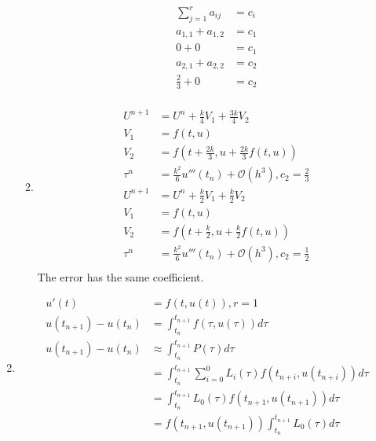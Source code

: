 \documentclass{article}
\begin{document}
\begin{enumerate}
\begin{enumerate}
\begin{equation*}
\begin{split}
		\end{split}
		\end{equation*}
		\begin{equation*}
		\begin{split}
		\sum_{j=1}^{r} a_{ij} & = c_{i} \\
		 a_{1,1}+a_{1,2} & = c_{1} \\
		0+0 & = c_{1} \\
		a_{2,1} + a_{2,2} & = c_{2} \\
		\frac{2}{3} + 0 & = c_{2} \\
		\end{split}
		\end{equation*}
	\item
		\begin{equation*}
		\begin{split}
			U^{n+1} & = U^{n} +  \frac{k}{4} V_{1} +\frac{3k}{4} V_{2} \\
			V_{1} &= f(t,u) \\
			V_{2} & = f(t+ \frac{2k}{3}, u + \frac{2k}{3} f(t,u)) \\ 
			\tau^{n} & =\frac{k^{2}}{6}u'''(t_{n}) + \mathcal{O}(h^{3}), c_{2} = \frac{2}{3} \\ 
			U^{n+1} & = U^{n} +  \frac{k}{2} V_{1} +\frac{k}{2} V_{2} \\
			V_{1} &= f(t,u) \\
			V_{2} & = f(t+ \frac{k}{2}, u + \frac{k}{2} f(t,u)) \\ 
			\tau^{n} & = \frac{k^{2}}{6} u'''(t_{n}) + \mathcal{O}(h^{3}), c_{2} = \frac{1}{2} \\ 
		\end{split}
		\end{equation*}
		The error has the same coefficient. 
	\end{enumerate}
\item
	\begin{equation*}
	\begin{split}
	u'(t) & = f(t,u(t)), r = 1 \\
	u(t_{n+1}) - u(t_{n}) & = \int_{t_{n}}^{t_{n+1}} f(\tau,u(\tau))d\tau \\
	u(t_{n+1}) - u(t_{n}) & \approx \int_{t_{n}}^{t_{n+1}} P(\tau) d\tau \\
	& =  \int_{t_{n}}^{t_{n+1}} \sum_{i=0}^{0} L_{i}(\tau)f(t_{n+i},u(t_{n+i})) d\tau \\
	& = \int_{t_{n}}^{t_{n+1}} L_{0}(\tau)f(t_{n+1},u(t_{n+1})) d\tau \\
	& = f(t_{n+1},u(t_{n+1})) \int_{t_{n}}^{t_{n+1}} L_{0}(\tau) d\tau \\

\end{split}
\end{equation*}
\end{enumerate}
\end{document}
